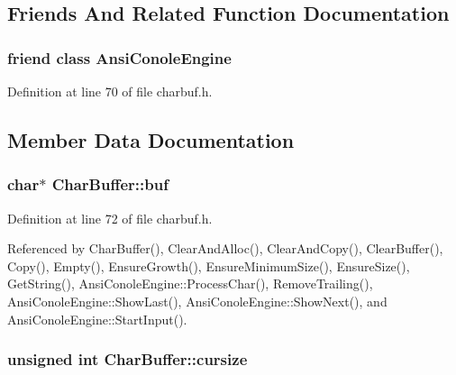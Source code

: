 \subsection{Friends And Related Function Documentation}
\subsubsection[{\texorpdfstring{Ansi\+Conole\+Engine}{AnsiConoleEngine}}]{\setlength{\rightskip}{0pt plus 5cm}friend class {\bf Ansi\+Conole\+Engine}\hspace{0.3cm}{\ttfamily [friend]}}\hypertarget{classCharBuffer_ada87df74cf9242ca8f0efe5b88f9c212}{}\label{classCharBuffer_ada87df74cf9242ca8f0efe5b88f9c212}


Definition at line 70 of file charbuf.\+h.



\subsection{Member Data Documentation}
\subsubsection[{\texorpdfstring{buf}{buf}}]{\setlength{\rightskip}{0pt plus 5cm}char$\ast$ Char\+Buffer\+::buf\hspace{0.3cm}{\ttfamily [private]}}\hypertarget{classCharBuffer_a8bcd8491b24db4197b311eb361609674}{}\label{classCharBuffer_a8bcd8491b24db4197b311eb361609674}


Definition at line 72 of file charbuf.\+h.



Referenced by Char\+Buffer(), Clear\+And\+Alloc(), Clear\+And\+Copy(), Clear\+Buffer(), Copy(), Empty(), Ensure\+Growth(), Ensure\+Minimum\+Size(), Ensure\+Size(), Get\+String(), Ansi\+Conole\+Engine\+::\+Process\+Char(), Remove\+Trailing(), Ansi\+Conole\+Engine\+::\+Show\+Last(), Ansi\+Conole\+Engine\+::\+Show\+Next(), and Ansi\+Conole\+Engine\+::\+Start\+Input().

\subsubsection[{\texorpdfstring{cursize}{cursize}}]{\setlength{\rightskip}{0pt plus 5cm}unsigned int Char\+Buffer\+::cursize\hspace{0.3cm}{\ttfamily [private]}}\hypertarget{classCharBuffer_ac3265c68505802fbe8b590d5a423b0d0}{}\label{classCharBuffer_ac3265c68505802fbe8b590d5a423b0d0}


